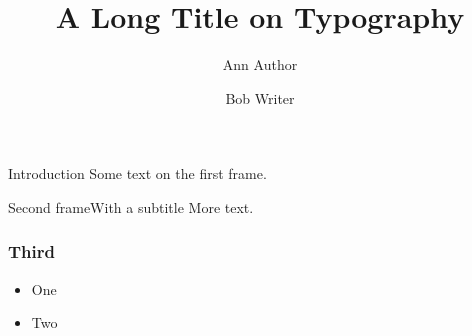 \documentclass{beamer}
\title[Typography gyp]{A Long Title on Typography}
\author{Ann Author \and Bob Writer}
\begin{document}
\begin{frame}{Introduction}
Some text on the first frame.
\end{frame}
\begin{frame}{Second frame}{With a subtitle}
More text.
\end{frame}
\begin{frame}
\frametitle{Third}
\begin{itemize}
\item One
\item Two
\end{itemize}
\end{frame}
\end{document}
